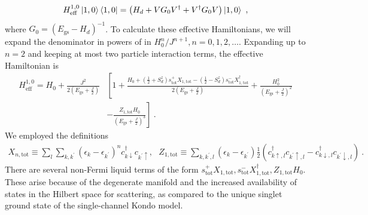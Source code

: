 \documentclass[10pt]{iopart}
\begin{document}
\begin{eqnarray}
	\label{eff_ham_10}
	H^{1,0}_\text{eff}\ket{1, 0}\bra{1, 0} = \left(H_d + V G_0 V^\dagger + V^\dagger G_0  V\right) \ket{1, 0}~,
\end{eqnarray}
where \(G_0 = \left(E_\text{gs} - H_d\right)^{-1}\). To calculate these effective Hamiltonians, we will expand the denominator in powers of in \(H_0^n/J^{n+1}, n=0,1,2,\ldots\). Expanding up to \(n=2\) and keeping at most two particle interaction terms, 
the effective Hamiltonian is
\begin{eqnarray}
	H_\text{eff}^{1, 0} = H_0 + \frac{J^2}{2\left(E_\text{gs} + \frac{J}{2}\right)}&\left[1 + \frac{ H_0 + \left(\frac{1}{2} + S_d^z\right) s^+_\text{tot}X_{1,\text{tot}} - \left(\frac{1}{2} - S_d^z\right) s^-_\text{tot}X^\dagger_{1,\text{tot}}}{2 \left(E_\text{gs} + \frac{J}{2}\right)} + \frac{H_0^2}{\left(E_\text{gs} + \frac{J}{2}\right)^2} \right.\nonumber\\
&\left.- \frac{Z_{1,\text{tot}} H_0}{\left(E_\text{gs} + \frac{J}{2}\right)^3} \right]~.
\end{eqnarray}
We employed the definitions 
\begin{eqnarray}
X_{n,\text{tot}} \equiv  \sum_l \sum_{k,k^\prime}\left(\epsilon_k - \epsilon_{k^\prime}\right)^n c^\dagger_{k \downarrow}c_{k^\prime \uparrow}, ~ ~ ~ Z_{1,\text{tot}} \equiv \sum_{k,k^\prime,l}\left( \epsilon_k - \epsilon_{k^\prime} \right) \frac{1}{2}\left(c^\dagger_{k \uparrow,l}c_{k^\prime \uparrow,l} - c^\dagger_{k \downarrow,l}c_{k^\prime \downarrow,l}\right)~.
\end{eqnarray}
There are several non-Fermi liquid terms of the form \(s^+_\text{tot}X_{1,\text{tot}}, s^-_\text{tot}X^\dagger_{1,\text{tot}},Z_{1,\text{tot}} H_0\). These arise because of the degenerate manifold and the increased availability of states in the Hilbert space for scattering, as compared to the unique singlet ground state of the single-channel Kondo model.
\end{document}
